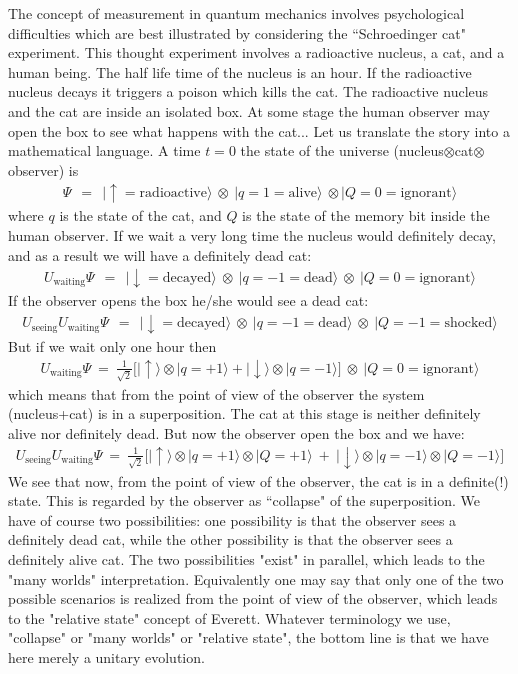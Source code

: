 \documentclass[onecolumn,fleqn]{revtex4}
\newcommand{\tbox}[1]{\text{#1}}
\newcommand{\beq}{\begin{eqnarray}}
\newcommand{\eeq}{\end{eqnarray}}
\begin{document}
The concept of measurement in quantum mechanics involves 
psychological difficulties which are best 
illustrated by considering the ``Schroedinger cat" experiment.  
This thought experiment involves a radioactive nucleus, 
a cat, and a human being.  
The half life time of the nucleus is an hour. 
If the radioactive nucleus decays it triggers 
a poison which kills the cat. 
The radioactive nucleus and the cat are inside 
an isolated box. At some stage the human observer 
may open the box to see what happens with the cat...   
Let us translate the story into a mathematical language.  
A time $t=0$ the state of the universe (nucleus$\otimes$cat$\otimes$observer) is 
\beq
\Psi \ \ = \ \ 
|\uparrow=\mbox{radioactive}\rangle \ \otimes 
\ |{q=1=\mbox{alive}}\rangle 
\ \otimes |{Q=0=\mbox{ignorant}}\rangle
\eeq
where $q$ is the state of the cat, and $Q$ is the state 
of the memory bit inside the human observer.    
If we wait a very long time the nucleus would 
definitely decay, and as a result we will have a 
definitely dead cat:
\beq
U_{\tbox{waiting}} \Psi 
\ \ = \ \
|\downarrow=\mbox{decayed}\rangle \ \otimes 
\ |{q=-1=\mbox{dead}}\rangle 
\ \otimes \ |{Q=0=\mbox{ignorant}}\rangle
\eeq
If the observer opens the box he/she would see a dead cat:
\beq
U_{\tbox{seeing}} U_{\tbox{waiting}} \Psi 
\ \ = \ \ 
|\downarrow=\mbox{decayed}\rangle \ \otimes 
\ |{q=-1=\mbox{dead}}\rangle 
\ \otimes \ |{Q=-1=\mbox{shocked}}\rangle
\eeq
But if we wait only one hour then 
\beq
U_{\tbox{waiting}} \Psi \ = 
\ \frac{1}{\sqrt{2}} \Big[ 
|\uparrow\rangle  \otimes |q=+1\rangle  + |\downarrow\rangle  \otimes |q=-1\rangle  
\Big]  
\ \otimes \ |{Q=0=\mbox{ignorant}}\rangle
\eeq
which means that from the point of view 
of the observer the system (nucleus+cat) 
is in a superposition. The cat at this 
stage is neither definitely alive 
nor definitely dead. But now the 
observer open the box and we have:
\beq
U_{\tbox{seeing}} U_{\tbox{waiting}} \Psi \ = 
\ \frac{1}{\sqrt{2}} \Big[ 
|\uparrow\rangle  \otimes |q=+1\rangle \otimes |Q=+1 \rangle
\ + \ 
|\downarrow\rangle  \otimes |q=-1\rangle \otimes |Q=-1\rangle
\Big]  
\eeq
We see that now, from the point of view of the observer,  
the cat is in a definite(!) state. This is regarded by 
the observer as ``collapse" of the superposition.
We have of course two possibilities: one possibility is that  
the observer sees a definitely dead cat, while the other 
possibility is that the observer sees a definitely alive cat. 
The two possibilities "exist" in parallel, which leads to 
the "many worlds" interpretation.  Equivalently one may 
say that only one of the two possible scenarios is realized 
from the point of view of the observer,   
which leads to the "relative state" concept of Everett.
Whatever terminology we use, "collapse" or "many worlds" 
or "relative state", the bottom line is that we have 
here merely a unitary evolution. 
 
\end{document}
